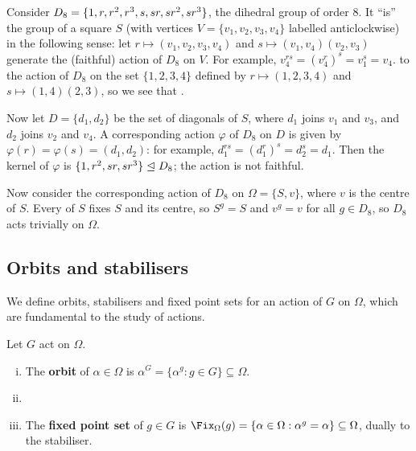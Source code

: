 \begin{example}\label{eg:action_D8_on_square}
    Consider $D_8 = \{1,r,r^2,r^3,s,\added{2}{sr,sr^2,sr^3}\}$, the dihedral group of order 8. It ``is'' the  group of a square $S$ (with vertices $V = \{v_1,v_2,v_3,v_4\}$ labelled anticlockwise) in the following sense: let $r \mapsto (v_1,v_2,v_3,v_4)$ and $s \mapsto (v_1,v_4)(v_2,v_3)$ generate the (faithful) action of $D_8$ on $V$. For example, $v_4^{rs} = (v_4^r)^s = v_1^s = v_4$.  to the action of $D_8$ on the set $\{1,2,3,4\}$ defined by $r \mapsto (1,2,3,4)$ and $s \mapsto (1,4)(2,3)$, so we see that .

    Now let $D = \{d_1,d_2\}$ be the set of diagonals of $S$, where $d_1$ joins $v_1$ and $v_3$, and $d_2$ joins $v_2$ and $v_4$. A corresponding action $\varphi$ of $D_8$ on $D$ is given by $\varphi(r) = \varphi(s) = (d_1,d_2)$: for example, $d_1^{rs} = (d_1^r)^s = d_2^s = d_1$. Then the kernel of $\varphi$ is $\{1,r^2,\added{2}{sr,sr^3}\} \trianglelefteq D_8$; the action is not faithful.

    Now consider the corresponding action of $D_8$ on $\Omega = \{S,v\}$, where $v$ is the centre of $S$. Every  of $S$ fixes $S$ and its centre, so $S^g = S$ and $v^g = v$ for all $g \in D_8$, so $D_8$ acts trivially on $\Omega$.
\end{example}

\subsection{Orbits and stabilisers}

We define orbits, stabilisers and fixed point sets for an action of $G$ on $\Omega$, which are fundamental to the study of actions.

\begin{definition}\label{def:orbit_stabiliser}
    Let $G$ act on $\Omega$.
    \begin{enumerate}[(i)]
        \item The \textbf{orbit} of $\alpha \in \Omega$ is $\alpha^G = \{\alpha^g : g \in G\} \subseteq \Omega$.
        \item {}
        \item The \textbf{fixed point set} of $g \in G$ is $\Fix_\Omega(g) = \{\alpha \in \Omega : \alpha^g = \alpha\} \subseteq \Omega$, dually to the stabiliser.
    \end{enumerate}
\end{definition}

